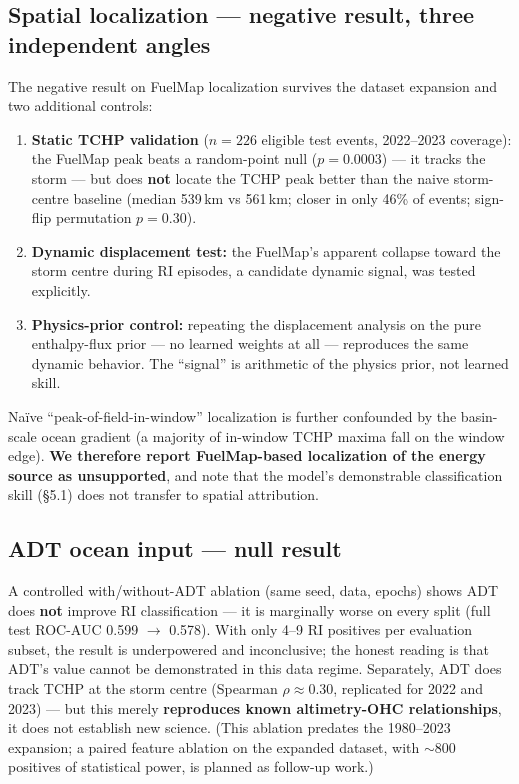 \documentclass[11pt]{article}
\begin{document}
\subsection{Spatial localization --- negative result, three independent angles}

The negative result on FuelMap localization survives the dataset expansion and
two additional controls:

\begin{enumerate}
  \item \textbf{Static TCHP validation} ($n = 226$ eligible test events,
        2022--2023 coverage): the FuelMap peak beats a random-point null
        ($p = 0.0003$) --- it tracks the storm --- but does \textbf{not}
        locate the TCHP peak better than the naive storm-centre baseline
        (median 539\,km vs 561\,km; closer in only 46\% of events; sign-flip
        permutation $p = 0.30$).
  \item \textbf{Dynamic displacement test:} the FuelMap's apparent collapse
        toward the storm centre during RI episodes, a candidate dynamic
        signal, was tested explicitly.
  \item \textbf{Physics-prior control:} repeating the displacement analysis
        on the pure enthalpy-flux prior --- no learned weights at all ---
        reproduces the same dynamic behavior. The ``signal'' is arithmetic of
        the physics prior, not learned skill.
\end{enumerate}

Na\"ive ``peak-of-field-in-window'' localization is further confounded by the
basin-scale ocean gradient (a majority of in-window TCHP maxima fall on the
window edge). \textbf{We therefore report FuelMap-based localization of the
energy source as unsupported}, and note that the model's demonstrable
classification skill (\S5.1) does not transfer to spatial attribution.

\subsection{ADT ocean input --- null result}

A controlled with/without-ADT ablation (same seed, data, epochs) shows ADT
does \textbf{not} improve RI classification --- it is marginally worse on
every split (full test ROC-AUC 0.599 $\rightarrow$ 0.578). With only 4--9 RI
positives per evaluation subset, the result is underpowered and inconclusive;
the honest reading is that ADT's value cannot be demonstrated in this data
regime. Separately, ADT does track TCHP at the storm centre (Spearman
$\rho \approx 0.30$, replicated for 2022 and 2023) --- but this merely
\textbf{reproduces known altimetry-OHC relationships}, it does not establish
new science. (This ablation predates the 1980--2023 expansion; a paired
feature ablation on the expanded dataset, with $\sim$800 positives of
statistical power, is planned as follow-up work.)
\end{document}
